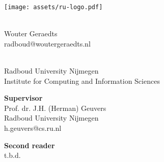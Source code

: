 \begin{titlepage}
	\begin{minipage}{0.50\linewidth}
		\begin{center}
			\texttt{[image: assets/ru-logo.pdf]}
		\end{center}
	\end{minipage}
	
	\vspace{13em}
	
	\makeatletter
	\begin{center}
		\begin{minipage}{0.75\linewidth}
			\begin{center}
				\huge \@title \vspace{2.5em} \\
				\huge Wouter Geraedts \vspace{0.5em} \\
				\large radboud@woutergeraedts.nl \vspace{2em} \\
				\large \@date
			\end{center}
		\end{minipage}
	\end{center}
	\makeatother
	
	\vspace{15.5em}
	
	\noindent \begin{minipage}{\linewidth}
		\textbf{\Ms} \vspace{0.5em} \\
		Radboud University Nijmegen \\
		Institute for Computing and Information Sciences
	\end{minipage}
	
	\vspace{3em}
	
	\noindent \begin{minipage}{0.45\linewidth}
		\textbf{Supervisor} \\
		Prof. dr. J.H. (Herman) Geuvers \\
		Radboud University Nijmegen \\
		h.geuvers@cs.ru.nl \\
	\end{minipage}
	\hspace{0.10\linewidth}
	\begin{minipage}{0.45\linewidth}
		\textbf{Second reader} \\
		t.b.d. \\
	\end{minipage}
\end{titlepage}
\restoregeometry
